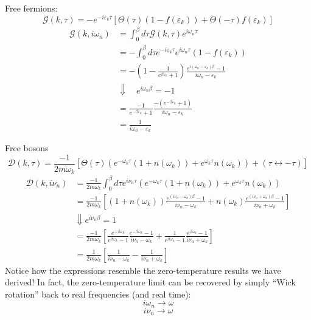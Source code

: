 Free fermions:
\[ \mathcal{G} \left( k,\tau \right) =-e^{-i\varepsilon _k\tau}\left[ \Theta \left( \tau \right) \left( 1-f\left( \varepsilon _k \right) \right) +\Theta \left( -\tau \right) f\left( \varepsilon _k \right) \right] \]
\begin{align*}
    \mathcal{G} \left( k,i\omega _n \right) &=\int_0^{\beta}{d\tau \mathcal{G} \left( k,\tau \right) e^{i\omega _n\tau}}\\
    &=-\int_0^{\beta}{d\tau e^{-i\varepsilon _k\tau}e^{i\omega _n\tau}\left( 1-f\left( \varepsilon _k \right) \right)}\\
    &=-\left( 1-\frac{1}{e^{\beta \varepsilon _k}+1} \right) \frac{e^{i\left( \omega _n-\varepsilon _k \right) \beta}-1}{i\omega _n-\varepsilon _k}\\
    &\Downarrow \quad e^{i\omega _n\beta}=-1\\
    &=\frac{-1}{e^{-\beta \varepsilon _k}+1}\frac{-\left( e^{-\beta \varepsilon _k}+1 \right)}{i\omega _n-\varepsilon _k}\\
    &=\frac{1}{i\omega _n-\varepsilon _k}
\end{align*}

Free bosons
\[ \mathscr{D} \left( k,\tau \right) =\frac{-1}{2m\omega _k}\left[ \Theta \left( \tau \right) \left( e^{-\omega _k\tau}\left( 1+n\left( \omega _k \right) \right) +e^{\omega _k\tau}n\left( \omega _k \right) \right) +\left( \tau \leftrightarrow -\tau \right) \right] \]
\begin{align*}
    \mathscr{D} \left( k,i\nu _n \right) &=\frac{-1}{2m\omega _k}\int_0^{\beta}{d\tau e^{i\nu _n\tau}\left( e^{-\omega _k\tau}\left( 1+n\left( \omega _k \right) \right) +e^{\omega _k\tau}n\left( \omega _k \right) \right)}\\
    &=\frac{-1}{2m\omega _k}\left[ \left( 1+n\left( \omega _k \right) \right) \frac{e^{\left( i\nu _n-\omega _k \right) \beta}-1}{i\nu _n-\omega _k}+n\left( \omega _k \right) \frac{e^{\left( i\nu _n+\omega _k \right) \beta}-1}{i\nu _n+\omega _k} \right] \\
    &\Downarrow e^{i\nu _n\beta}=1\\
    &=\frac{-1}{2m\omega _k}\left[ \frac{e^{-\beta \omega _k}}{e^{\beta \omega _k}-1}\frac{e^{-\beta \omega _k}-1}{i\nu _n-\omega _k}+\frac{1}{e^{\beta \omega _k}-1}\frac{e^{\beta \omega _k}-1}{i\nu _n+\omega _k} \right] \\
    &=\frac{1}{2m\omega _k}\left[ \frac{1}{i\nu _n-\omega _k}-\frac{1}{i\nu _n+\omega _k} \right]
\end{align*}
Notice how the expressions resemble the zero-temperature results we have derived! In fact, the zero-temperature limit can be recovered by simply ``Wick rotation'' back to real frequencies (and real time):
\[ i\omega _n\rightarrow \omega \]
\[ i\nu _n\rightarrow \omega \]


